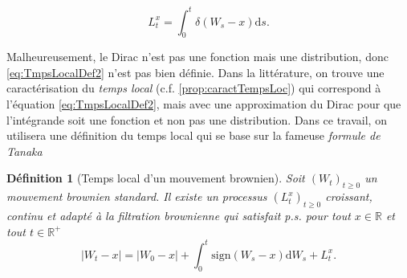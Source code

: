 \documentclass[openany]{book}
\newcommand{\R}{\mathbb{R}}
\newcommand{\1}{\mathbbm{1}}
\newcommand{\sign}{\text{sign}}
\renewcommand{\d}{\mathrm{d}}
\theoremstyle{thmfont}
\theoremstyle{deffont}
\newtheorem{definition}[definition]{Définition}
\theoremstyle{thmfont}
\theoremstyle{deffont}
\begin{document}
\begin{equation}
  \label{eq:TmpsLocalDef2}
  L^x_t= \int_0^t\delta(W_s-x)\d s.
\end{equation}

Malheureusement, le Dirac n'est pas une fonction mais une distribution, donc \eqref{eq:TmpsLocalDef2} n'est pas bien définie. Dans la littérature, on trouve une caractérisation du \textit{temps local} (c.f. \autoref{prop:caractTempsLoc}) qui correspond à l'équation \eqref{eq:TmpsLocalDef2}, mais avec une approximation du Dirac pour que l'intégrande soit une fonction et non pas une distribution. Dans ce travail, on utilisera une définition du temps local qui se base sur la fameuse \textit{formule de Tanaka}\\

\begin{definition}[Temps local d'un mouvement brownien]
  \label{def:TempsLoc}
  Soit $(W_t)_{t\geq0}$ un mouvement brownien standard. Il existe un processus $(L_t^x)_{t\geq0}$ croissant, continu et adapté à la filtration brownienne qui satisfait p.s. pour tout $x \in \R$ et tout $t \in \R^+$
  \begin{equation}
    |W_t -x|  = |W_0-x| + \int_0^t\sign(W_s - x)\d W_s + L_t^x.
    \label{eq:tempsLocDef}
  \end{equation}
\end{definition}
\end{document}

